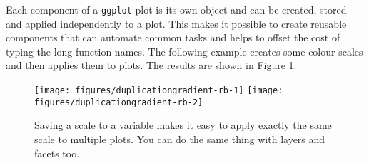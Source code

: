 \begin{Shaded}
\begin{Highlighting}[]
  \StringTok{ }
\StringTok{  }\NormalTok{(} \NormalTok{) +}
\StringTok{  }\NormalTok{(}\NormalTok{, }\NormalTok{) +}\StringTok{ }\NormalTok{(}\NormalTok{, }\NormalTok{)}
\end{Highlighting}
\end{Shaded}


Each component of a \texttt{ggplot} plot is its own object and can be
created, stored and applied independently to a plot. This makes it
possible to create reusable components that can automate common tasks
and helps to offset the cost of typing the long function names. The
following example creates some colour scales and then applies them to
plots. The results are shown in Figure \ref{fig:gradient-rb}.
 

\begin{Shaded}
\begin{Highlighting}[]
\StringTok{ }\NormalTok{(} \NormalTok{, } \NormalTok{)}
  \StringTok{ }
  \NormalTok{) +}
\StringTok{  }
\end{Highlighting}
\end{Shaded}

\begin{figure}

{\centering \texttt{[image: figures/duplicationgradient-rb-1]} \texttt{[image: figures/duplicationgradient-rb-2]} 

}

\caption{Saving a scale to a variable makes it easy to apply exactly the same scale to multiple plots.  You can do the same thing with layers and facets too.\label{fig:gradient-rb}}
\end{figure}

